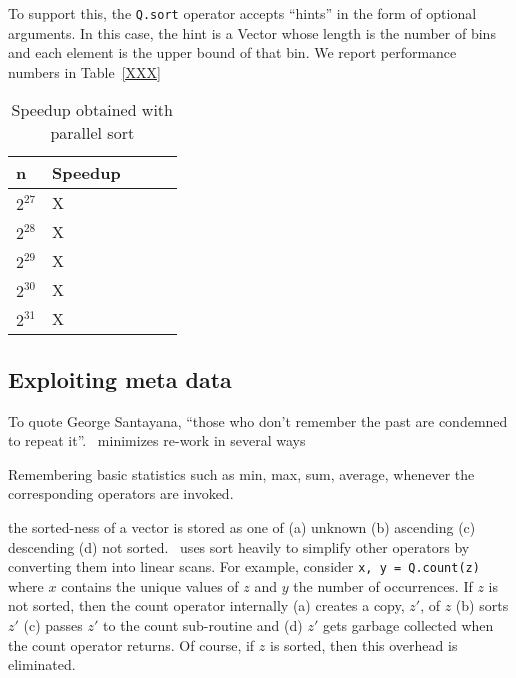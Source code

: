 To support this, the {\tt Q.sort} operator accepts ``hints'' in the form of
optional arguments. In this case, the hint is a Vector whose length is the
number of bins and each element is the upper bound of that bin. We report
performance numbers in Table~\ref{XXX}

\begin{table}
\centering
\begin{tabular}{|l|l|l|l|l|} \hline \hline
  {\bf n} & {\bf Speedup} \\ \hline \hline
  \(2^{27}\) & X \\ \hline
  \(2^{28}\) & X \\ \hline
  \(2^{29}\) & X \\ \hline
  \(2^{30}\) & X \\ \hline
  \(2^{31}\) & X \\ \hline
  \hline
\end{tabular}
\caption{Speedup obtained with parallel sort}
\label{tbl_sort_speedup}
\end{table}

\subsection{Exploiting meta data}

To quote George Santayana, ``those who don't remember the past are condemned to
repeat it''.  \Q\ minimizes re-work in several ways
\be
\item 
Remembering basic statistics such as min, max, sum, average, whenever the
corresponding operators are invoked. 
\item the sorted-ness of a vector is
stored as one of (a) unknown (b) ascending (c) descending (d) not sorted. \Q\
uses sort heavily to simplify other operators by converting them into linear
scans. For example, consider {\tt x, y  = Q.count(z)} where \(x\) contains the
unique values of \(z\) and \(y\) the number of occurrences. If \(z\) is not
sorted, then the count operator internally (a) creates a copy, \(z'\), of \(z\)
(b) sorts \(z'\) (c) passes \(z'\) to the count sub-routine and (d) \(z'\) gets
garbage collected when the count operator returns. Of course, if \(z\) is
sorted, then this overhead is eliminated.

\ee
